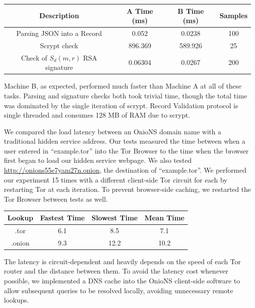 \documentclass{sig-alternate}
\begin{document}
\renewcommand{\arraystretch}{1}
\begin{center}
    \begin{tabular}{ | c | c | c | c |}
    \hline
    \textbf{Description} & \textbf{A Time (ms)} & \textbf{B Time (ms)} & \textbf{Samples} \\
    \hline
    Parsing JSON into a Record & 0.052 & 0.0238 & 100 \\ \hline
	Scrypt check & 896.369 & 589.926 & 25 \\ \hline
	Check of $ S_{d}(m, r) $ RSA signature & 0.06304 & 0.0267 & 200 \\
	\hline
    \end{tabular}
\end{center}

Machine B, as expected, performed much faster than Machine A at all of these tasks. Parsing and signature checks both took trivial time, though the total time was dominated by the single iteration of scrypt. Record Validation protocol is single threaded and consumes 128 MB of RAM due to scrypt.

We compared the load latency between an OnioNS domain name with a traditional hidden service address. Our tests measured the time between when a user entered in ``example.tor'' into the Tor Browser to the time when the browser first began to load our hidden service webpage. We also tested \url{http://onions55e7yam27n.onion}, the destination of ``example.tor''. We performed our experiment 15 times with a different client-side Tor circuit for each by restarting Tor at each iteration. To prevent browser-side caching, we restarted the Tor Browser between tests as well. 

\renewcommand{\arraystretch}{1}
\begin{center}
    \begin{tabular}{ | c | c | c | c |}
    \hline
    \textbf{Lookup} & \textbf{Fastest Time} & \textbf{Slowest Time} & \textbf{Mean Time} \\
    \hline
    .tor & 6.1 & 8.5 & 7.1 \\ \hline
	.onion & 9.3 & 12.2 & 10.2 \\
	\hline
    \end{tabular}
\end{center}

The latency is circuit-dependent and heavily depends on the speed of each Tor router and the distance between them. To avoid the latency cost whenever possible, we implemented a DNS cache into the OnioNS client-side software to allow subsequent queries to be resolved locally, avoiding unnecessary remote lookups.
\end{document}
